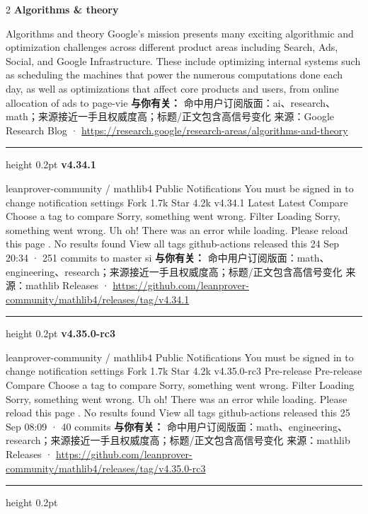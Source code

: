 \documentclass[10.5pt]{ctexart}
\begin{document}
\begin{multicols}{2}
{\large\bfseries Algorithms \& theory}\par
Algorithms and theory Google’s mission presents many exciting algorithmic and optimization challenges across different product areas including Search, Ads, Social, and Google Infrastructure. These include optimizing internal systems such as scheduling the machines that power the numerous computations done each day, as well as optimizations that affect core products and users, from online allocation of ads to page-vie
\textbf{与你有关：} 命中用户订阅版面：ai、research、math；来源接近一手且权威度高；标题/正文包含高信号变化
{\footnotesize\color{ormuted} 来源：Google Research Blog · \url{https://research.google/research-areas/algorithms-and-theory}}
\vspace{2mm}
\hrule height 0.2pt
\vspace{2mm}
{\large\bfseries v4.34.1}\par
leanprover-community / mathlib4 Public Notifications You must be signed in to change notification settings Fork 1.7k Star 4.2k v4.34.1 Latest Latest Compare Choose a tag to compare Sorry, something went wrong. Filter Loading Sorry, something went wrong. Uh oh! There was an error while loading. Please reload this page . No results found View all tags github-actions released this 24 Sep 20:34 · 251 commits to master si
\textbf{与你有关：} 命中用户订阅版面：math、engineering、research；来源接近一手且权威度高；标题/正文包含高信号变化
{\footnotesize\color{ormuted} 来源：mathlib Releases · \url{https://github.com/leanprover-community/mathlib4/releases/tag/v4.34.1}}
\vspace{2mm}
\hrule height 0.2pt
\vspace{2mm}
{\large\bfseries v4.35.0-rc3}\par
leanprover-community / mathlib4 Public Notifications You must be signed in to change notification settings Fork 1.7k Star 4.2k v4.35.0-rc3 Pre-release Pre-release Compare Choose a tag to compare Sorry, something went wrong. Filter Loading Sorry, something went wrong. Uh oh! There was an error while loading. Please reload this page . No results found View all tags github-actions released this 25 Sep 08:09 · 40 commits
\textbf{与你有关：} 命中用户订阅版面：math、engineering、research；来源接近一手且权威度高；标题/正文包含高信号变化
{\footnotesize\color{ormuted} 来源：mathlib Releases · \url{https://github.com/leanprover-community/mathlib4/releases/tag/v4.35.0-rc3}}
\vspace{2mm}
\hrule height 0.2pt

\end{multicols}
\end{document}
